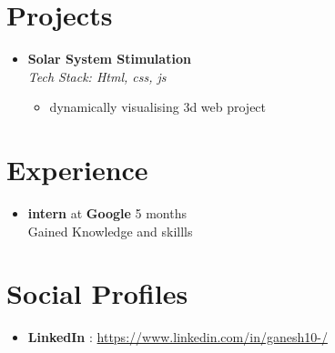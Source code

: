 \documentclass[a4paper,10pt]{article}
\begin{document}

\section*{Projects}
\begin{itemize}[leftmargin=*]
  
    \item \textbf{ Solar System Stimulation }\\
    \textit{Tech Stack: Html, css, js }%
    

    \vspace{-0.5em} %
    \begin{itemize}[leftmargin=1.5em, itemsep=0pt, topsep=0pt]
      
        \item dynamically visualising 3d web project
      
    \end{itemize}
    \vspace{-0.5em} %
  
\end{itemize}




\section*{Experience}
\begin{itemize}[leftmargin=*]
    
    \item \textbf{ intern } at \textbf{ Google } \hfill 5 months \\
    Gained Knowledge and skillls
    
\end{itemize}



\section*{Social Profiles}
\begin{itemize}[leftmargin=*]
  
    \item \textbf{ LinkedIn }: \href{ https://www.linkedin.com/in/ganesh10-/ }{ https://www.linkedin.com/in/ganesh10-/ }
  
\end{itemize}
\end{document}

